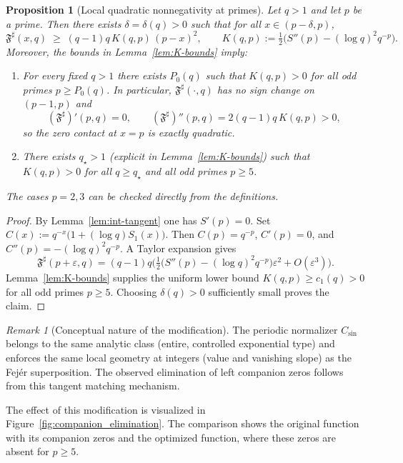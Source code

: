 \documentclass[11pt,a4paper]{amsart}
\newcommand{\Fbase}{\mathfrak F}
\newcommand{\Fsharp}{\Fbase^{\sharp}}
\theoremstyle{plain}
\newtheorem{proposition}[theorem]{Proposition}
\theoremstyle{definition}
\theoremstyle{remark}
\newtheorem{remark}[theorem]{Remark}
\begin{document}
\begin{proposition}[Local quadratic nonnegativity at primes]\label{prop:local-nonneg}
Let $q>1$ and let $p$ be a prime. Then there exists $\delta=\delta(q)>0$ such that for all $x\in(p-\delta,p)$,
\[
\Fsharp(x,q)\;\ge\; (q-1)q\,K(q,p)\,(p-x)^2,
\qquad
K(q,p):=\tfrac12\Big(S''(p)-(\log q)^2 q^{-p}\Big).
\]
Moreover, the bounds in Lemma~\ref{lem:K-bounds} imply:
\begin{enumerate}
\item For every fixed $q>1$ there exists $P_0(q)$ such that $K(q,p)>0$ for all odd primes $p\ge P_0(q)$. In particular, $\Fsharp(\cdot,q)$ has no sign change on $(p-1,p)$ and
\[
(\Fsharp)'(p,q)=0,\qquad (\Fsharp)''(p,q)=2(q-1)q\,K(q,p)>0,
\]
so the zero contact at $x=p$ is exactly quadratic.
\item There exists $q_\star>1$ (explicit in Lemma~\ref{lem:K-bounds}) such that $K(q,p)>0$ for all $q\ge q_\star$ and all odd primes $p\ge5$.
\end{enumerate}
The cases $p=2,3$ can be checked directly from the definitions.
\end{proposition}

\begin{proof}
By Lemma~\ref{lem:int-tangent} one has $S'(p)=0$. Set $C(x):=q^{-x}\bigl(1+(\log q)S_1(x)\bigr)$. Then $C(p)=q^{-p}$, $C'(p)=0$, and $C''(p)=-(\log q)^2 q^{-p}$. A Taylor expansion gives
\[
\Fsharp(p+\varepsilon,q)=(q-1)q\Big(\tfrac12\big(S''(p)-(\log q)^2 q^{-p}\big)\varepsilon^{2}+O(\varepsilon^{3})\Big).
\]
Lemma~\ref{lem:K-bounds} supplies the uniform lower bound $K(q,p)\ge c_1(q)>0$ for all odd primes $p\ge5$. Choosing $\delta(q)>0$ sufficiently small proves the claim.
\end{proof}

\begin{remark}[Conceptual nature of the modification]\label{rem:not-cosmetic}
The periodic normalizer $C_{\sin}$ belongs to the same analytic class (entire, controlled exponential type) and enforces the same local geometry at integers (value and vanishing slope) as the Fej\'er superposition. The observed elimination of left companion zeros follows from this tangent matching mechanism.
\end{remark}

\noindent The effect of this modification is visualized in Figure~\ref{fig:companion_elimination}. The comparison shows the original function with its companion zeros and the optimized function, where these zeros are absent for $p\ge 5$.
\end{document}
